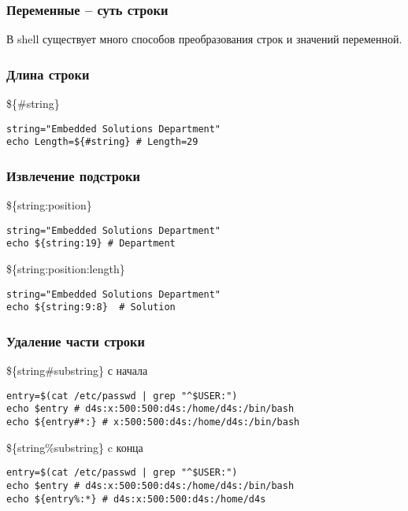 

\begin{frame}
	\frametitle{Переменные -- суть строки}

	\begin{center}
	В shell существует много способов преобразования строк и значений переменной.
	\end{center}

\end{frame}


\begin{frame}[fragile]
	\frametitle{Длина строки}

	\begin{block}{\$\{\#string\}}
	\begin{lstlisting}
string="Embedded Solutions Department"
echo Length=${#string} # Length=29
	\end{lstlisting}
	\end{block}

\end{frame}


\begin{frame}[fragile]
	\frametitle{Извлечение подстроки}

	\begin{block}{\$\{string:position\}}
	\begin{lstlisting}
string="Embedded Solutions Department"
echo ${string:19} # Department
\end{lstlisting}
	\end{block}

	\pause
	\begin{block}{\$\{string:position:length\}}
	\begin{lstlisting}
string="Embedded Solutions Department"
echo ${string:9:8}  # Solution
\end{lstlisting}
	\end{block}

\end{frame}

\begin{frame}[fragile]
	\frametitle{Удаление части строки}

	\begin{block}{\$\{string\#substring\} с начала}
	\begin{lstlisting}
entry=$(cat /etc/passwd | grep "^$USER:")
echo $entry # d4s:x:500:500:d4s:/home/d4s:/bin/bash
echo ${entry#*:} # x:500:500:d4s:/home/d4s:/bin/bash
\end{lstlisting}
	\end{block}

	\pause

	\begin{block}{\$\{string\%substring\} c конца}
	\begin{lstlisting}
entry=$(cat /etc/passwd | grep "^$USER:")
echo $entry # d4s:x:500:500:d4s:/home/d4s:/bin/bash
echo ${entry%:*} # d4s:x:500:500:d4s:/home/d4s 
\end{lstlisting}
	\end{block}



\end{frame}

